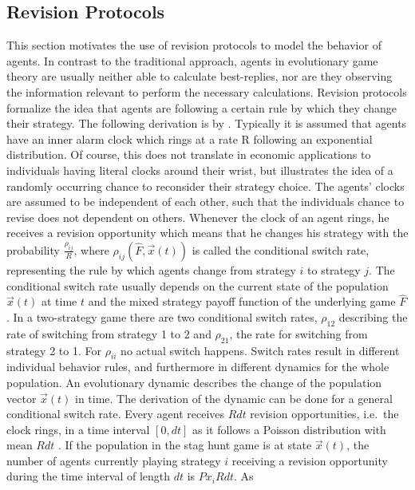 \subsection{Revision Protocols}
\label{sec:revisionprotocols}
This section motivates the use of revision protocols to
model the behavior of agents.
In contrast to the traditional approach, agents in evolutionary game theory 
are usually neither able to calculate best-replies, 
nor are they observing the information relevant
to perform the necessary calculations.
Revision protocols formalize the idea that agents are following a certain
rule by which they change their strategy. 
The following derivation is by \textcite{sandholm_population_2010}. 
Typically it is assumed that agents have an inner alarm clock 
which rings at a rate R following an exponential distribution. 
Of course, this does not translate 
in economic applications to individuals having literal clocks around their
wrist, but illustrates the idea of a randomly occurring chance to reconsider
their strategy choice.
The agents' clocks are assumed to be independent of each other, such that
the individuals chance to revise does not dependent on others.
Whenever the clock of an agent rings, he
receives a revision opportunity which means that he changes his strategy
with the probability $\frac{\rho_{ij}}{R}$, where
$\rho_{ij}(\hat{F},\vec{x}(t))$ is called the conditional switch rate,
representing the rule by which agents change from strategy 
$i$ to strategy $j$. The conditional switch rate usually depends
on the current state of the population $\vec{x}(t)$ at time $t$ and the
mixed strategy payoff function of the underlying game $\hat{F}$.
In a two-strategy game there are two conditional switch rates, $\rho_{12}$ 
describing the rate of switching from strategy 1 to 2 and $\rho_{21}$, 
the rate for switching from strategy 2 to 1. For $\rho_{ii}$ no actual switch 
happens.
Switch rates result in different individual behavior rules, and furthermore 
in different dynamics for the whole population. An evolutionary
dynamic describes the change of the population vector $\vec{x}(t)$ in time. 
The derivation of the dynamic can be done for a general conditional switch 
rate. 
Every agent receives $R dt$ revision opportunities, i.e.\ the clock rings, 
in a time interval $[0,dt]$ as it follows a Poisson distribution with
mean $Rdt$ \parencite[123]{sandholm_population_2010}. 
If the population in the stag hunt game is at state $\vec{x}(t)$, the number 
of agents currently playing strategy $i$ receiving a revision opportunity 
during the time interval of length $dt$ is $Px_i R dt$. As 
